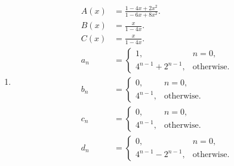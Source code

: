 \documentclass{sig-alternate-05-2015}
\begin{document}
\begin{enumerate}
\begin{enumerate}
		\item \begin{align}
			A(x) & = \frac{1 - 4x + 2x^2}{1 - 6x + 8x^2}.\\
			B(x) & = \frac{x}{1 - 4x}.\\
			C(x) & = \frac{x}{1 - 4x}.\\
			a_n & = \begin{cases}
				1, & n = 0,\\
				4^{n-1} + 2^{n - 1}, & \text{otherwise}.
			\end{cases}\\
			b_n & = \begin{cases}
				0, & n = 0,\\
				4^{n - 1}, & \text{otherwise}.
			\end{cases}\\
			c_n & = \begin{cases}
				0, & n = 0,\\
				4^{n - 1}, & \text{otherwise}.
			\end{cases}\\
			d_n & = \begin{cases}
				0, & n = 0,\\
				4^{n - 1} - 2^{n - 1}, & \text{otherwise}.
			\end{cases}
		\end{align}
	\end{enumerate}
\end{enumerate}
\end{document}
